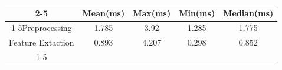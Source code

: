 \documentclass{standalone}
\begin{document}
 
 \begin{tabular}{|c |c |c |c |c |}
\cline{2-5}\cline{2-5} \multicolumn{1}{c |}{ } & Mean(ms) & Max(ms) & Min(ms) & Median(ms)\\ 
\cline{1-5}Preprocessing & 1.785 & 3.92 & 1.285 & 1.775\\ 
 \hhline{|=|=|=|=|=|}Feature Extaction & 0.893 & 4.207 & 0.298 & 0.852\\ 
 \cline{1-5}\hline \end{tabular}
 
\end{document}
